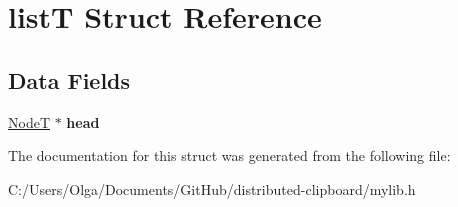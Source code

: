\hypertarget{structlist_t}{}\section{listT Struct Reference}
\label{structlist_t}
\subsection*{Data Fields}
\begin{DoxyCompactItemize}
\item 
\mbox{\label{structlist_t_ade12b0b627d6007bfcb02bbc055c5ed0}} 
\mbox{\hyperlink{structnode_t}{NodeT}} $\ast$ {\bfseries head}
\end{DoxyCompactItemize}


The documentation for this struct was generated from the following file\+:\begin{DoxyCompactItemize}
\item 
C\+:/\+Users/\+Olga/\+Documents/\+Git\+Hub/distributed-\/clipboard/mylib.\+h\end{DoxyCompactItemize}
